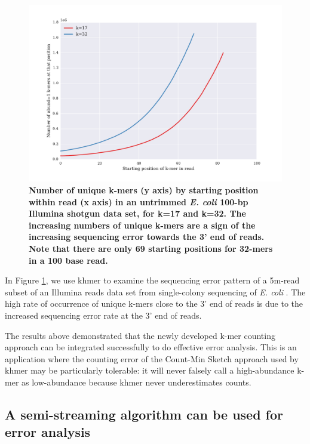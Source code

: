 \begin{figure}[!ht]
\centerline{\includegraphics[width=5in]{./figures/figure7_perc_unique_pos}}
\caption{\bf Number of unique k-mers (y axis) by starting position within read
(x axis) in an untrimmed {\em E. coli} 100-bp Illumina shotgun data set, for
k=17 and k=32.  The increasing numbers of unique k-mers are a sign of the
increasing sequencing error towards the 3' end of reads.  Note that there are
only 69 starting positions for 32-mers in a 100 base read.}
\label{fig:perc_unique_pos} \end{figure}



In Figure \ref{fig:perc_unique_pos}, we use khmer to examine the sequencing
error pattern of a 5m-read subset of an Illumina reads data set from
single-colony sequencing of {\em E. coli} \cite{pubmed21926975}.  The high rate
of occurrence of unique k-mers close to the 3' end of reads is due to the
increased sequencing error rate at the 3' end of reads.


The results above demonstrated that the newly developed 
k-mer counting approach can be integrated successfully to do effective error 
analysis. This is an application where the counting error of the Count-Min Sketch approach
used by khmer may be particularly tolerable: it will never falsely
call a high-abundance k-mer as low-abundance because khmer never
underestimates counts.



\subsection{A semi-streaming algorithm can be used for error analysis}



